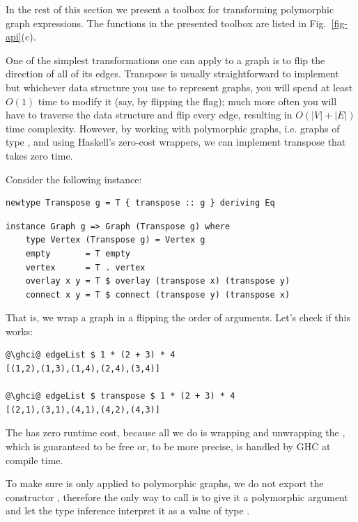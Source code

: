 In the rest of this section we present a toolbox for transforming polymorphic graph
expressions. The functions in the presented toolbox are listed in Fig.~\ref{fig-api}(c).

One of the simplest transformations one can apply to a graph is to flip the
direction of all of its edges. Transpose is usually straightforward to implement but
whichever data structure you use to represent graphs, you will spend at least
$O(1)$ time to modify it (say, by flipping the  flag);
much more often you will have to traverse the data structure and flip every edge,
resulting in $O(|V|+|E|)$ time complexity. However, by working with polymorphic
graphs, i.e. graphs of type , and using Haskell's
zero-cost  wrappers, we can implement transpose that takes zero time.

Consider the following  instance:

\begin{verbatim}
newtype Transpose g = T { transpose :: g } deriving Eq
\end{verbatim}
\vspace{1mm}
\begin{verbatim}
instance Graph g => Graph (Transpose g) where
    type Vertex (Transpose g) = Vertex g
    empty       = T empty
    vertex      = T . vertex
    overlay x y = T $ overlay (transpose x) (transpose y)
    connect x y = T $ connect (transpose y) (transpose x)
\end{verbatim}

\noindent
That is, we wrap a graph in a  flipping the order of  arguments.
Let's check if this works:

\begin{verbatim}
@\ghci@ edgeList $ 1 * (2 + 3) * 4
[(1,2),(1,3),(1,4),(2,4),(3,4)]

@\ghci@ edgeList $ transpose $ 1 * (2 + 3) * 4
[(2,1),(3,1),(4,1),(4,2),(4,3)]
\end{verbatim}

The  has zero runtime cost, because all we do is wrapping and unwrapping
the , which is guaranteed to be free or, to be more precise, is handled
by GHC at compile time.

To make sure  is only applied to polymorphic graphs, we do not export
the constructor , therefore the only way to call  is to give it a
polymorphic argument and let the type inference interpret it as a value of type
.

